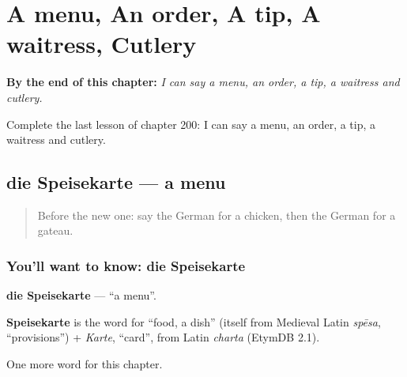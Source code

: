 
\chapter{A menu, An order, A tip, A waitress, Cutlery}
\label{ch:ge-a-menu-an-order-a-tip-a-waitress-cutlery}

\begin{chapteropening}
\textbf{By the end of this chapter:} \emph{I can say a menu, an order, a tip, a waitress and cutlery.}

Complete the last lesson of chapter 200: I can say a menu, an order, a tip, a waitress and cutlery.
\end{chapteropening}

\section[die Speisekarte]{die Speisekarte — a menu}

\label{lesson:GE-C200-speisekarte}



\begin{quote}
Before the new one: say the German for a chicken, then the German for a gateau.
\end{quote}

\subsection*{You'll want to know: die Speisekarte}
\textbf{die Speisekarte} — \textquotedblleft{}a menu\textquotedblright{}.

\begin{cousinweb}
\textbf{Speisekarte} is the word for \textquotedblleft{}food, a dish\textquotedblright{} (itself from Medieval Latin \emph{spēsa}, \textquotedblleft{}provisions\textquotedblright{}) + \emph{Karte}, \textquotedblleft{}card\textquotedblright{}, from Latin \emph{charta} (EtymDB 2.1).
\end{cousinweb}

\begin{grammarlens}[title={What you've built}]
One more word for this chapter.
\end{grammarlens}


